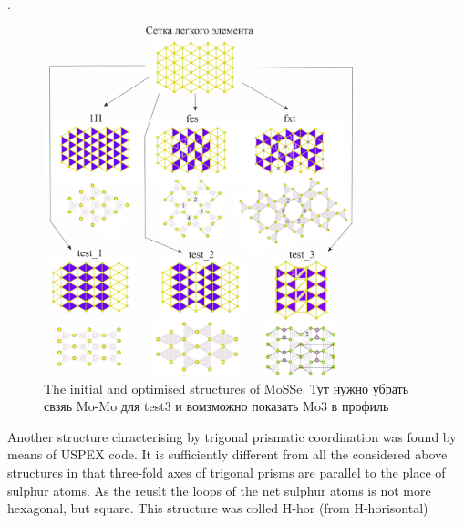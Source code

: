 .\documentclass[a4paperm]{article}
\begin{document}
\begin{figure}[H] \centering
        \includegraphics[width=0.8\textwidth]{H-based.jpg}
        \caption{The initial and optimised structures of MoSSe. Тут нужно убрать свзяь Mo-Mo для test3 и вомзможно показать Mo3 в профиль}
\label{H-based}
\end{figure}


Another structure chracterising by trigonal prismatic coordination was found by means of USPEX code.
It is sufficiently different from all the considered above structures in that three-fold axes of trigonal prisms are parallel to the place of sulphur atoms.
As the reuslt the loops of the net sulphur atoms is not more hexagonal, but square. 
This structure was colled H-hor (from H-horisontal)
\end{document}
